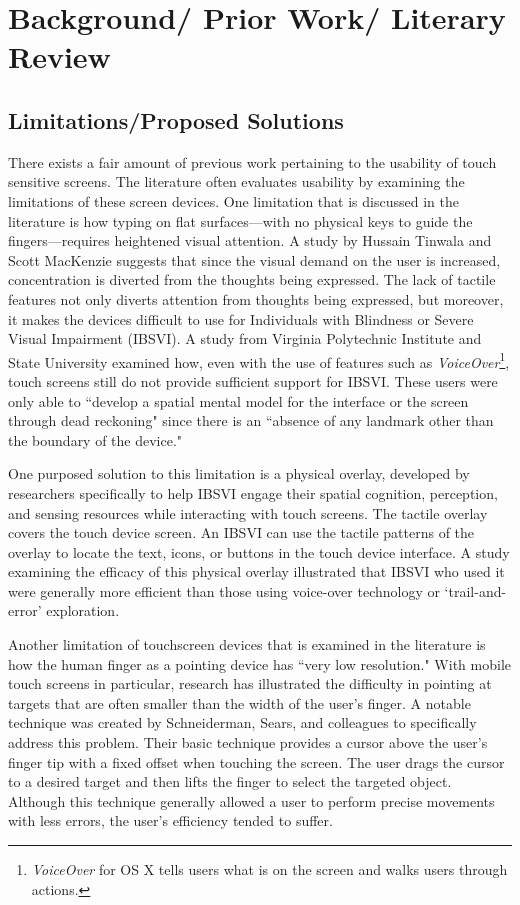\documentclass{article}
\begin{document}
\section{Background/ Prior Work/ Literary Review}
\subsection{Limitations/Proposed Solutions}
There exists a fair amount of previous work pertaining to the usability of touch sensitive screens. The literature often evaluates usability by examining the limitations of these screen devices. One limitation that is discussed in the literature is how typing on flat surfaces---with no physical keys to guide the fingers---requires heightened visual attention. A study by Hussain Tinwala and Scott MacKenzie suggests that since the visual demand on the user is increased, concentration is diverted from the thoughts being expressed. \cite{Tinwala:2010:ETE:1868914.1868972} The lack of tactile features not only diverts attention from thoughts being expressed, but moreover, it makes the devices difficult to use for Individuals with Blindness or Severe Visual Impairment (IBSVI). A study from Virginia Polytechnic Institute and State University examined how, even with the use of features such as  \textit{VoiceOver}\footnote{\textit{VoiceOver} for OS X tells users what is on the screen and walks users through actions.\cite{VoiceOver}}, touch screens still do not provide sufficient support for IBSVI. These users were only able to ``develop a spatial mental model for the interface or the screen through dead reckoning" since there is an ``absence of any landmark other than the boundary of the device." \cite{El-Glaly:2013:TTF:2460625.2460665} 

One purposed solution to this limitation is a physical overlay, developed by researchers specifically to help IBSVI engage their spatial cognition, perception, and sensing resources while interacting with touch screens.  \cite{El-Glaly:2013:TTF:2460625.2460665} The tactile overlay covers the touch device screen. An IBSVI can use the tactile patterns of the overlay to locate the text, icons, or buttons in the touch device interface. A study examining the efficacy of this physical overlay illustrated that IBSVI who used it were generally more efficient than those using voice-over technology or `trail-and-error' exploration. \cite{El-Glaly:2013:TTF:2460625.2460665}


Another limitation of touchscreen devices that is examined in the literature is how the human finger as a pointing device has ``very low resolution."\cite{Albinsson} With mobile touch screens in particular, research has illustrated the difficulty in pointing at targets that are often smaller than the width of the user's finger. A notable technique was created by Schneiderman, Sears, and colleagues to specifically address this problem.\cite{Sears} Their basic technique provides a cursor above the user's finger tip with a fixed offset when touching the screen. The user drags the cursor to a desired target and then lifts the finger to select the targeted object. Although this technique generally allowed a user to perform precise movements with less errors, the user's efficiency tended to suffer.\cite{Sears}
\end{document}
